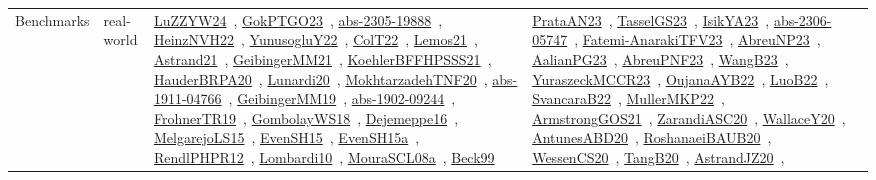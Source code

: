 {\begin{longtable}{lp{3cm}>{\raggedright\arraybackslash}p{6cm}>{\raggedright\arraybackslash}p{6cm}>{\raggedright\arraybackslash}p{8cm}}
Benchmarks & real-world & \href{../works/LuZZYW24.pdf}{LuZZYW24}~\cite{LuZZYW24}, \href{../works/GokPTGO23.pdf}{GokPTGO23}~\cite{GokPTGO23}, \href{../works/abs-2305-19888.pdf}{abs-2305-19888}~\cite{abs-2305-19888}, \href{../works/HeinzNVH22.pdf}{HeinzNVH22}~\cite{HeinzNVH22}, \href{../works/YunusogluY22.pdf}{YunusogluY22}~\cite{YunusogluY22}, \href{../works/ColT22.pdf}{ColT22}~\cite{ColT22}, \href{../works/Lemos21.pdf}{Lemos21}~\cite{Lemos21}, \href{../works/Astrand21.pdf}{Astrand21}~\cite{Astrand21}, \href{../works/GeibingerMM21.pdf}{GeibingerMM21}~\cite{GeibingerMM21}, \href{../works/KoehlerBFFHPSSS21.pdf}{KoehlerBFFHPSSS21}~\cite{KoehlerBFFHPSSS21}, \href{../works/HauderBRPA20.pdf}{HauderBRPA20}~\cite{HauderBRPA20}, \href{../works/Lunardi20.pdf}{Lunardi20}~\cite{Lunardi20}, \href{../works/MokhtarzadehTNF20.pdf}{MokhtarzadehTNF20}~\cite{MokhtarzadehTNF20}, \href{../works/abs-1911-04766.pdf}{abs-1911-04766}~\cite{abs-1911-04766}, \href{../works/GeibingerMM19.pdf}{GeibingerMM19}~\cite{GeibingerMM19}, \href{../works/abs-1902-09244.pdf}{abs-1902-09244}~\cite{abs-1902-09244}, \href{../works/FrohnerTR19.pdf}{FrohnerTR19}~\cite{FrohnerTR19}, \href{../works/GombolayWS18.pdf}{GombolayWS18}~\cite{GombolayWS18}, \href{../works/Dejemeppe16.pdf}{Dejemeppe16}~\cite{Dejemeppe16}, \href{../works/MelgarejoLS15.pdf}{MelgarejoLS15}~\cite{MelgarejoLS15}, \href{../works/EvenSH15.pdf}{EvenSH15}~\cite{EvenSH15}, \href{../works/EvenSH15a.pdf}{EvenSH15a}~\cite{EvenSH15a}, \href{../works/RendlPHPR12.pdf}{RendlPHPR12}~\cite{RendlPHPR12}, \href{../works/Lombardi10.pdf}{Lombardi10}~\cite{Lombardi10}, \href{../works/MouraSCL08a.pdf}{MouraSCL08a}~\cite{MouraSCL08a}, \href{../works/Beck99.pdf}{Beck99}~\cite{Beck99} & \href{../works/PrataAN23.pdf}{PrataAN23}~\cite{PrataAN23}, \href{../works/TasselGS23.pdf}{TasselGS23}~\cite{TasselGS23}, \href{../works/IsikYA23.pdf}{IsikYA23}~\cite{IsikYA23}, \href{../works/abs-2306-05747.pdf}{abs-2306-05747}~\cite{abs-2306-05747}, \href{../works/Fatemi-AnarakiTFV23.pdf}{Fatemi-AnarakiTFV23}~\cite{Fatemi-AnarakiTFV23}, \href{../works/AbreuNP23.pdf}{AbreuNP23}~\cite{AbreuNP23}, \href{../works/AalianPG23.pdf}{AalianPG23}~\cite{AalianPG23}, \href{../works/AbreuPNF23.pdf}{AbreuPNF23}~\cite{AbreuPNF23}, \href{../works/WangB23.pdf}{WangB23}~\cite{WangB23}, \href{../works/YuraszeckMCCR23.pdf}{YuraszeckMCCR23}~\cite{YuraszeckMCCR23}, \href{../works/OujanaAYB22.pdf}{OujanaAYB22}~\cite{OujanaAYB22}, \href{../works/LuoB22.pdf}{LuoB22}~\cite{LuoB22}, \href{../works/SvancaraB22.pdf}{SvancaraB22}~\cite{SvancaraB22}, \href{../works/MullerMKP22.pdf}{MullerMKP22}~\cite{MullerMKP22}, \href{../works/ArmstrongGOS21.pdf}{ArmstrongGOS21}~\cite{ArmstrongGOS21}, \href{../works/ZarandiASC20.pdf}{ZarandiASC20}~\cite{ZarandiASC20}, \href{../works/WallaceY20.pdf}{WallaceY20}~\cite{WallaceY20}, \href{../works/AntunesABD20.pdf}{AntunesABD20}~\cite{AntunesABD20}, \href{../works/RoshanaeiBAUB20.pdf}{RoshanaeiBAUB20}~\cite{RoshanaeiBAUB20}, \href{../works/WessenCS20.pdf}{WessenCS20}~\cite{WessenCS20}, \href{../works/TangB20.pdf}{TangB20}~\cite{TangB20}, \href{../works/AstrandJZ20.pdf}{AstrandJZ20}~\cite{AstrandJZ20}, 
\end{longtable}}
